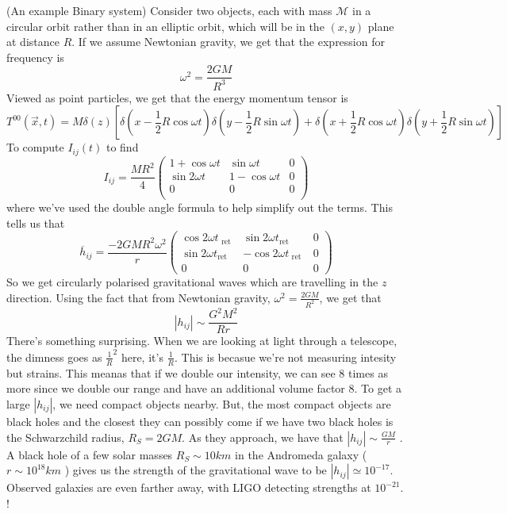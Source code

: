 \begin{example}{(An example Binary system)}
	Consider two objects, each with mass $ \mathcal{ M } $ 
	in a circular orbit rather than in an elliptic orbit, 
	which will be in the $ \left( x, y  \right)  $ plane 
	at distance $ R $. 
	If we assume Newtonian gravity, we 
	get that the expression for frequency 
	is 
	\[
	 \omega ^ 2  = \frac{2 G M }{ R ^ 3  }
	\] Viewed as point particles, 
	we get that the energy momentum tensor is 
	\[
		T ^{ 0 0 } \left( \vec{x}, t  \right)  = M \delta ( z ) 
		\left[  \delta \left( x - \frac{1}{2 } R \cos \omega t  \right)  \delta \left( y  - \frac{1}{2 } R \sin \omega t  \right) + \delta \left( x + \frac{1}{2 } R \cos \omega t  \right)  \delta \left(  y + \frac{1}{2 } R \sin \omega t  \right)  \right] 
	\] To compute 
	$ I _{ ij } \left(  t \right)  $ to find 
	\[
	 I _{ ij }  = \frac{M R ^ 2 }{ 4 } 
	 \begin{pmatrix}  1 + \cos \omega t & \sin \omega t & 0 \\
	 \sin 2 \omega t & 1 - \cos \omega t & 0 \\
 0 & 0 & 0 \\ \end{pmatrix} 
	\] where we've used the double angle formula 
	to help simplify out the terms. 
	This tells us that 
	\[
	 \overline{ h } _{ ij }  = \frac{ -  2 G M R ^ 2 \omega ^ 2 }{ r } 
	 \begin{pmatrix}  \cos 2 \omega t_{ \text{ ret } } & \sin 2 \omega t _{ \text{ret } } & 0 \\ \sin 2 \omega t _{ \text{ret } } & - \cos 2 \omega t_{ \text{ ret } } & 0 \\ 0 & 0 & 0  \end{pmatrix} 
	\] So we get circularly polarised gravitational waves which 
	are travelling in the $ z $ direction. Using the fact 
	that from Newtonian gravity, $ \omega ^ 2  = \frac{ 2 G M }{ R ^ 2 } $, 
	we get that 
	\[
	 | h_{ ij } | \sim \frac{ G ^ 2 M ^ 2 }{ R r }
	\] There's something surprising. 
	When we are looking at light through a telescope, 
	the dimness goes as $ \frac{1}{R  } ^ 2 $ here, it's
	$ \frac{1}{  R} $. This is becasue we're not 
	measuring intesity but strains. This 
	meanas that if we double our intensity, 
	we can see $ 8 $ times as more since we double our range 
	and have an additional volume factor  $ 8 $. 
	To get a large $ | h _{ ij } | $, we need compact objects 
	nearby. But, the most compact objects 
	are black holes and the closest they 
	can possibly come if we have two black holes is 
	the Schwarzchild radius, $ R _S  = 2 G M $.
	As they approach, 
we have that $ | h _{ ij } | \sim \frac{ G M }{ r } $ . 
A black hole of a few solar masses $ R _ S \sim 10 k m $
in the Andromeda galaxy ($ r \sim 10 ^{ 18 } km $  )
gives us the strength of the gravitational wave 
to be $ |h _{ ij } | \simeq 10 ^{ - 17 } $.
Observed galaxies are even farther away, 
with LIGO detecting strengths at $ 10 ^{ - 21 }$. ! 



\end{example}
